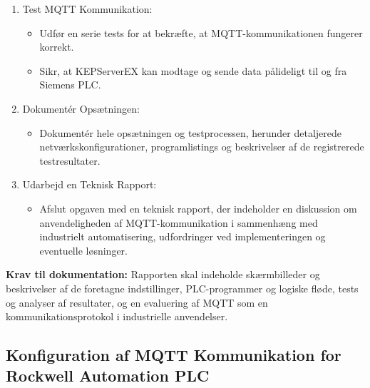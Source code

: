 \begin{enumerate}
\begin{itemize}
	\end{itemize}
	\item Test MQTT Kommunikation:
	\begin{itemize}
		\item Udfør en serie tests for at bekræfte, at MQTT-kommunikationen fungerer korrekt.
		\item Sikr, at KEPServerEX kan modtage og sende data pålideligt til og fra Siemens PLC.
	\end{itemize}
	\item Dokumentér Opsætningen:
	\begin{itemize}
		\item Dokumentér hele opsætningen og testprocessen, herunder detaljerede netværkskonfigurationer, programlistings og beskrivelser af de registrerede testresultater.
	\end{itemize}
	\item Udarbejd en Teknisk Rapport:
	\begin{itemize}
		\item Afslut opgaven med en teknisk rapport, der indeholder en diskussion om anvendeligheden af MQTT-kommunikation i sammenhæng med industrielt automatisering, udfordringer ved implementeringen og eventuelle løsninger.
	\end{itemize}
\end{enumerate}
\textbf{Krav til dokumentation:} Rapporten skal indeholde skærmbilleder og beskrivelser af de foretagne indstillinger, PLC-programmer og logiske fløde, tests og analyser af resultater, og en evaluering af MQTT som en kommunikationsprotokol i industrielle anvendelser.
\subsection*{Konfiguration af MQTT Kommunikation for Rockwell Automation PLC}
\label{subsec:mqtt_comm_rockwell}

